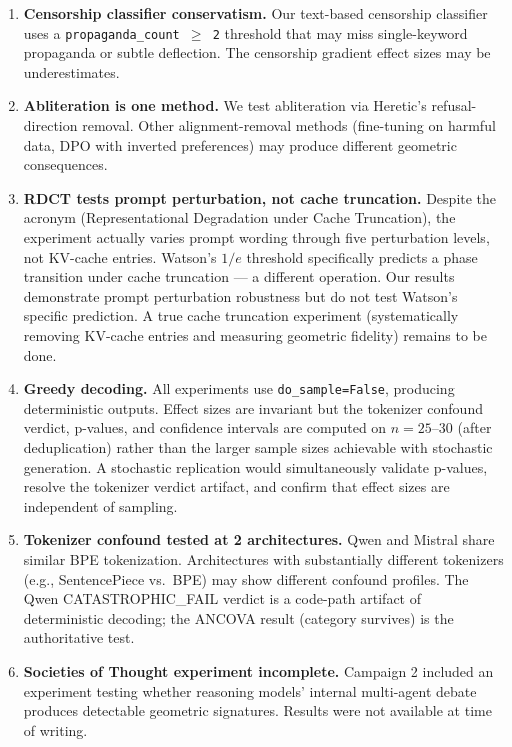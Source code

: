\documentclass[11pt,a4paper]{article}
\begin{document}
\begin{enumerate}[leftmargin=*]
    \item \textbf{Censorship classifier conservatism.} Our text-based censorship classifier uses a \texttt{propaganda\_count $\geq$ 2} threshold that may miss single-keyword propaganda or subtle deflection. The censorship gradient effect sizes may be underestimates.

    \item \textbf{Abliteration is one method.} We test abliteration via Heretic's refusal-direction removal. Other alignment-removal methods (fine-tuning on harmful data, DPO with inverted preferences) may produce different geometric consequences.

    \item \textbf{RDCT tests prompt perturbation, not cache truncation.} Despite the acronym (Representational Degradation under Cache Truncation), the experiment actually varies prompt wording through five perturbation levels, not KV-cache entries. Watson's $1/e$ threshold specifically predicts a phase transition under cache truncation --- a different operation. Our results demonstrate prompt perturbation robustness but do not test Watson's specific prediction. A true cache truncation experiment (systematically removing KV-cache entries and measuring geometric fidelity) remains to be done.

    \item \textbf{Greedy decoding.} All experiments use \texttt{do\_sample=False}, producing deterministic outputs. Effect sizes are invariant but the tokenizer confound verdict, p-values, and confidence intervals are computed on $n = 25$--$30$ (after deduplication) rather than the larger sample sizes achievable with stochastic generation. A stochastic replication would simultaneously validate p-values, resolve the tokenizer verdict artifact, and confirm that effect sizes are independent of sampling.

    \item \textbf{Tokenizer confound tested at 2 architectures.} Qwen and Mistral share similar BPE tokenization. Architectures with substantially different tokenizers (e.g., SentencePiece vs.\ BPE) may show different confound profiles. The Qwen CATASTROPHIC\_FAIL verdict is a code-path artifact of deterministic decoding; the ANCOVA result (category survives) is the authoritative test.

    \item \textbf{Societies of Thought experiment incomplete.} Campaign 2 included an experiment testing whether reasoning models' internal multi-agent debate \citep{kim2025reasoning} produces detectable geometric signatures. Results were not available at time of writing.


\end{enumerate}
\end{document}

